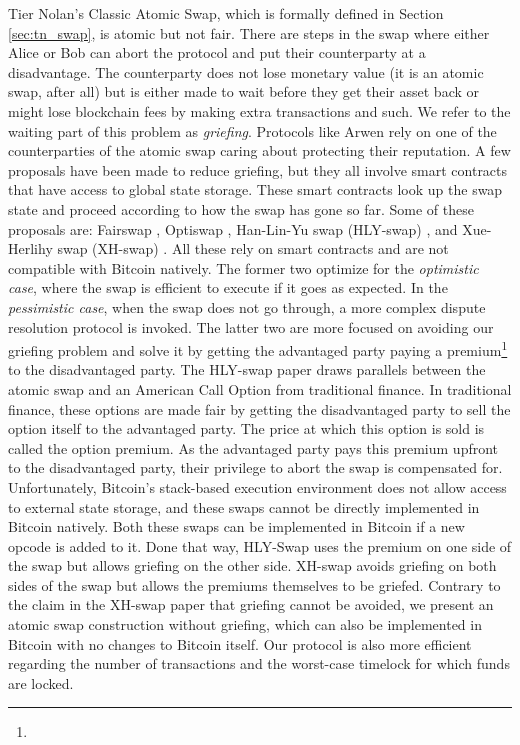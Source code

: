 Tier Nolan's Classic Atomic Swap, which is formally defined in Section \ref{sec:tn_swap}, is atomic but not fair. There are steps in the swap where either Alice or Bob can abort the protocol and put their counterparty at a disadvantage. The counterparty does not lose monetary value (it is an atomic swap, after all) but is either made to wait before they get their asset back or might lose blockchain fees by making extra transactions and such. We refer to the waiting part of this problem as \textit{griefing}. Protocols like Arwen \cite{arwen_protocol} rely on one of the counterparties of the atomic swap caring about protecting their reputation. A few proposals have been made to reduce griefing, but they all involve smart contracts that have access to global state storage. These smart contracts look up the swap state and proceed according to how the swap has gone so far. Some  of these proposals are: Fairswap \cite{fairswap}, Optiswap \cite{optiswap}, Han-Lin-Yu swap (HLY-swap) \cite{atomic_swaps_american_call_options}, and Xue-Herlihy swap (XH-swap) \cite{xue_herlihy_swap}. All these rely on smart contracts and are not compatible with Bitcoin natively. The former two optimize for the \textit{optimistic case}, where the swap is efficient to execute if it goes as expected. In the \textit{pessimistic case}, when the swap does not go through, a more complex dispute resolution protocol is invoked. The latter two are more focused on avoiding our griefing problem and solve it by getting the advantaged party paying a premium\footnote{} to the disadvantaged party. The HLY-swap paper draws parallels between the atomic swap and an American Call Option from traditional finance. In traditional finance, these options are made fair by getting the disadvantaged party to sell the option itself to the advantaged party. The price at which this option is sold is called the option premium. As the advantaged party pays this premium upfront to the disadvantaged party, their privilege to abort the swap is compensated for. Unfortunately, Bitcoin's stack-based execution environment does not allow access to external state storage, and these swaps cannot be directly implemented in Bitcoin natively. Both these swaps can be implemented in Bitcoin if a new opcode is added to it. Done that way, HLY-Swap uses the premium on one side of the swap but allows griefing on the other side. XH-swap avoids griefing on both sides of the swap but allows the premiums themselves to be griefed. Contrary to the claim in the XH-swap paper that griefing cannot be avoided, we present an atomic swap construction without griefing, which can also be implemented in Bitcoin with no changes to Bitcoin itself. Our protocol is also more efficient regarding the number of transactions and the worst-case timelock for which funds are locked.

